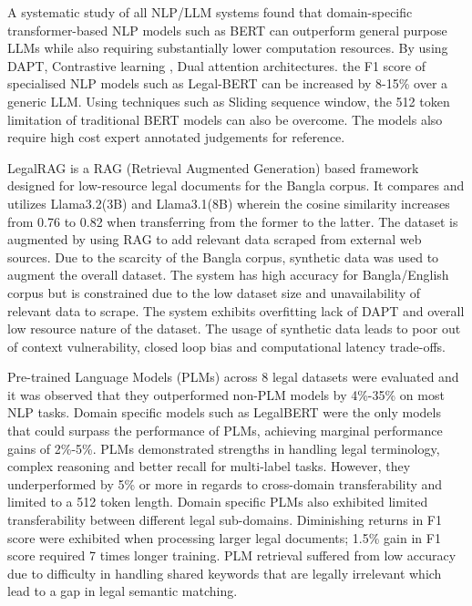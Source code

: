 A systematic study of all NLP/LLM systems found that domain-specific transformer-based NLP models such as BERT can outperform general purpose LLMs while also requiring substantially lower computation resources\cite{b19}. By using DAPT\cite{b13}, Contrastive learning\cite{b8} \cite{b14}, Dual attention architectures\cite{b11}. the F1 score of specialised NLP models such as Legal-BERT can be increased by 8-15\% over a generic LLM. Using techniques such as Sliding sequence window, the 512 token limitation\cite{b9} of traditional BERT models can also be overcome. The models also require high cost expert annotated judgements for reference.


LegalRAG is a RAG (Retrieval Augmented Generation) based framework designed for low-resource legal documents for the Bangla corpus. It compares and utilizes Llama3.2(3B) and Llama3.1(8B) wherein the cosine similarity increases from 0.76 to 0.82 when transferring from the former to the latter\cite{b20}. The dataset is augmented by using RAG to add relevant data scraped from external web sources. Due to the scarcity of the Bangla corpus, synthetic data was used to augment the overall dataset. The system has high accuracy for Bangla/English corpus but is constrained due to the low dataset size and unavailability of relevant data to scrape. The system exhibits overfitting lack of DAPT and overall low resource nature of the dataset. The usage of synthetic data leads to poor out of context vulnerability, closed loop bias and computational latency trade-offs.


Pre-trained Language Models (PLMs) across 8 legal datasets were evaluated and it was observed that they outperformed non-PLM models by 4\%-35\% on most NLP tasks. Domain specific models such as LegalBERT were the only models that could surpass the performance of PLMs\cite{b21}, achieving marginal performance gains of 2\%-5\%. PLMs demonstrated strengths in handling legal terminology, complex reasoning and better recall for multi-label tasks. However, they underperformed by 5\% or more in regards to cross-domain transferability and limited to a 512 token length.  Domain specific PLMs also exhibited limited transferability between different legal sub-domains. Diminishing returns in F1 score were exhibited when processing larger legal documents; 1.5\% gain in F1 score required 7 times longer training. PLM retrieval suffered from low accuracy due to difficulty in handling shared keywords that are legally irrelevant which lead to a gap in legal semantic matching.


